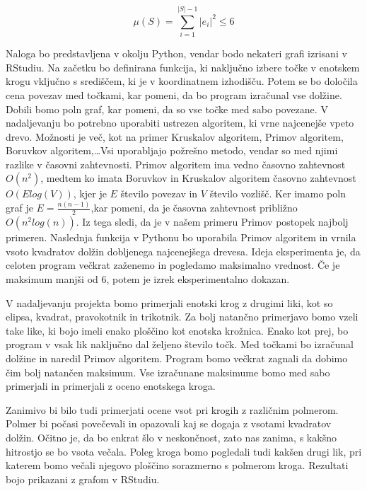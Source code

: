 \documentclass[a4paper]{report}
\begin{document}
$$ \mu (S) = \sum_{i=1}^{|S|-1} |e_i|^2 \leq 6 $$

Naloga bo predstavljena v okolju Python, vendar bodo nekateri grafi izrisani v RStudiu. Na začetku bo definirana funkcija, ki naključno izbere točke v enotskem krogu vključno s središčem, ki je v koordinatnem izhodišču. Potem se bo določila cena povezav med točkami, kar pomeni, da bo program izračunal vse dolžine. Dobili bomo poln graf, kar pomeni, da so vse točke med sabo povezane. V nadaljevanju bo potrebno uporabiti ustrezen algoritem, ki vrne najcenejše vpeto drevo. Možnosti je več, kot na primer Kruskalov algoritem, Primov algoritem, Boruvkov algoritem,\ldots Vsi uporabljajo požrešno metodo, vendar so med njimi razlike v časovni zahtevnosti. Primov algoritem ima vedno časovno zahtevnost $O(n^2)$, medtem ko imata Boruvkov in Kruskalov algoritem  časovno zahtevnost $O(Elog(V))$, kjer je $E$ število povezav in $V$ število vozlišč. Ker imamo poln graf je $E=\frac{n(n-1)}{2}$,kar pomeni, da je časovna zahtevnost približno $O(n^2log(n))$. Iz tega sledi, da je v našem primeru Primov postopek najbolj primeren. Naslednja funkcija v Pythonu bo uporabila Primov algoritem in vrnila vsoto kvadratov dolžin dobljenega najcenejšega drevesa. Ideja eksperimenta je, da celoten program večkrat zaženemo in pogledamo maksimalno vrednost. Če je maksimum manjši od 6, potem je izrek eksperimentalno dokazan.

V nadaljevanju projekta bomo primerjali enotski krog z drugimi liki, kot so elipsa, kvadrat, pravokotnik in trikotnik. Za bolj natančno primerjavo bomo vzeli take like, ki bojo imeli enako ploščino kot enotska krožnica. Enako kot prej, bo program v vsak lik naključno dal željeno število točk. Med točkami bo izračunal dolžine in naredil Primov algoritem. Program bomo večkrat zagnali da dobimo čim bolj natančen maksimum. Vse izračunane maksimume bomo med sabo primerjali in primerjali z oceno enotskega kroga. 

Zanimivo bi bilo tudi primerjati ocene vsot pri krogih z različnim polmerom. Polmer bi počasi povečevali in opazovali kaj se dogaja z vsotami kvadratov dolžin. Očitno je, da bo enkrat šlo v neskončnost, zato nas zanima, s kakšno hitrostjo se bo vsota večala. Poleg kroga bomo pogledali tudi kakšen drugi lik, pri katerem bomo večali njegovo ploščino sorazmerno s polmerom kroga. Rezultati bojo prikazani z grafom v RStudiu.
\end{document}
